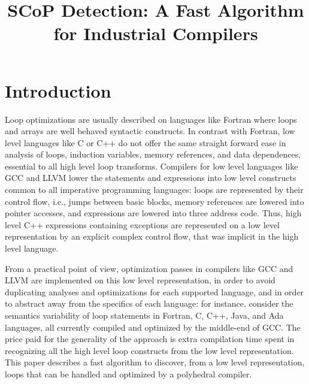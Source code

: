 \documentclass{sigplanconf}
\begin{document}
\setlength{\pdfpageheight}{\paperheight}
\setlength{\pdfpagewidth}{\paperwidth}


\title{SCoP Detection: A Fast Algorithm for Industrial Compilers}

\maketitle

\begin{abstract}
\end{abstract}

\section{Introduction}

Loop optimizations are usually described on languages like Fortran where loops
and arrays are well behaved syntactic constructs.  In contrast with Fortran, low
level languages like C or C++ do not offer the same straight forward ease in
analysis of loops, induction variables, memory references, and data dependences,
essential to all high level loop transforms.  Compilers for low level languages
like GCC and LLVM lower the statements and expressions into low level constructs
common to all imperative programming languages: loops are represented by their
control flow, i.e., jumps between basic blocks, memory references are lowered
into pointer accesses, and expressions are lowered into three address code.
Thus, high level C++ expressions containing exceptions are represented on a low
level representation by an explicit complex control flow, that was implicit in
the high level language.

From a practical point of view, optimization passes in compilers like GCC and
LLVM are implemented on this low level representation, in order to avoid
duplicating analyses and optimizations for each supported language, and in order
to abstract away from the specifics of each language: for instance, consider the
semantics variability of loop statements in Fortran, C, C++, Java, and Ada
languages, all currently compiled and optimized by the middle-end of GCC.  The
price paid for the generality of the approach is extra compilation time spent in
recognizing all the high level loop constructs from the low level
representation.  This paper describes a fast algorithm to discover, from a low
level representation, loops that can be handled and optimized by a polyhedral
compiler.
\end{document}
